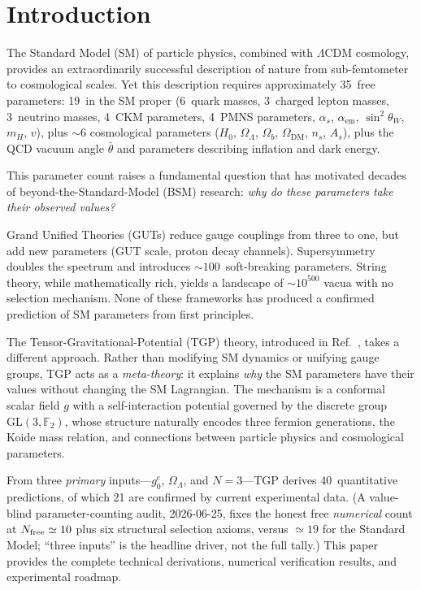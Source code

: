 \documentclass[aps,prd,twocolumn,superscriptaddress,showpacs,
  nofootinbib,floatfix,longbibliography]{revtex4-2}
\newcommand{\gone}{{g_0^e}}
\newcommand{\OL}{\Omega_\Lambda}
\newcommand{\GL}{\mathrm{GL}(3,\mathbb{F}_2)}
\newcommand{\as}{\alpha_s}
\begin{document}
\section{Introduction}\label{sec:intro}

The Standard Model (SM) of particle physics, combined with $\Lambda$CDM
cosmology, provides an extraordinarily successful description of nature
from sub-femtometer to cosmological scales. Yet this description requires
approximately 35~free parameters: 19~in the SM proper (6~quark masses,
3~charged lepton masses, 3~neutrino masses, 4~CKM parameters,
4~PMNS parameters, $\as$, $\alpha_\mathrm{em}$, $\sin^2\theta_W$,
$m_H$, $v$), plus $\sim 6$ cosmological parameters
($H_0$, $\OL$, $\Omega_b$, $\Omega_\mathrm{DM}$, $n_s$, $A_s$),
plus the QCD vacuum angle $\bar\theta$ and parameters describing
inflation and dark energy.

This parameter count raises a fundamental question that has motivated
decades of beyond-the-Standard-Model (BSM) research: \emph{why do these
parameters take their observed values?}

Grand Unified Theories (GUTs) reduce gauge couplings from three to one,
but add new parameters (GUT scale, proton decay channels). Supersymmetry
doubles the spectrum and introduces $\sim 100$~soft-breaking parameters.
String theory, while mathematically rich, yields a landscape of
$\sim 10^{500}$ vacua with no selection mechanism. None of these
frameworks has produced a confirmed prediction of SM parameters from
first principles.

The Tensor-Gravitational-Potential (TGP) theory, introduced in
Ref.~\cite{TGP_main}, takes a different approach. Rather than modifying
SM dynamics or unifying gauge groups, TGP acts as a \emph{meta-theory}:
it explains \emph{why} the SM parameters have their values without
changing the SM Lagrangian. The mechanism is a conformal scalar field $g$
with a self-interaction potential governed by the discrete group
$\GL$, whose structure naturally encodes three fermion generations, the
Koide mass relation, and connections between particle physics and
cosmological parameters.

From three \emph{primary} inputs---$\gone$, $\OL$, and $N=3$---TGP derives
40~quantitative predictions, of which 21 are confirmed by current
experimental data. (A value-blind parameter-counting audit, 2026-06-25,
fixes the honest free \emph{numerical} count at $N_{\rm free}\simeq 10$
plus six structural selection axioms, versus $\simeq 19$ for the Standard
Model; ``three inputs'' is the headline driver, not the full tally.)
This paper provides the complete technical derivations,
numerical verification results, and experimental roadmap.
\end{document}
